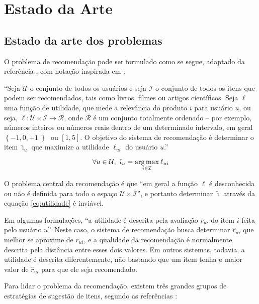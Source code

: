 \chapter[Estado da arte]{Estado da Arte}
\label{chap:estado_da_arte}

\section{Estado da arte dos problemas} %
\label{sec:estado_da_arte_dos_problemas}

O problema de recomendação pode ser formulado como se segue, adaptado da referência \cite{adomavicius2005toward}, com notação inspirada em \cite{symeonidis2007feature}: 

``Seja $\mathcal{U}$ o conjunto de todos os usuários e seja $\mathcal{I}$ o conjunto de todos os itens que podem ser recomendados, tais como livros, filmes ou artigos científicos. Seja $\ell$ uma função de utilidade, que mede a relevância do produto $i$ para usuário $u$, ou seja, $\ell: \mathcal{U} \times \mathcal{I} \rightarrow \mathcal{R}$, onde $\mathcal{R}$ é um  conjunto totalmente ordenado -- por exemplo, números inteiros ou números reais dentro de um determinado intervalo, em geral $\left\{-1, 0, +1\left\}$ ou $[1, 5]$. O objetivo do sistema de recomendação é determinar o item $\tilde{\imath}_u$ que maximize a utilidade $\ell_{ui}$ do usuário $u$.''

\begin{equation} 
\label{eq:utilidade}
\forall u \in \mathcal{U}, ~ \tilde{\imath}_u = \operatorname*{arg\,max}_{i \in \mathcal{I}}{\ell_{ui}}
\end{equation}

O problema central da recomendação é que ``em geral a função $\ell$ é desconhecida ou não é definida para todo o espaço $\mathcal{U} \times \mathcal{I}$'', e portanto determinar $\tilde{\imath}$ através da equação \ref{eq:utilidade} é inviável. 

Em algumas formulações, ``a utilidade é descrita pela avaliação $r_{ui}$ do item $i$ feita pelo usuário $u$''. Neste caso, o sistema de recomendação busca determinar $\hat{r}_{ui}$ que melhor se aproxime de $r_{ui}$, e a qualidade da recomendação é normalmente descrita pela distância entre esses dois valores. Em outros sistemas, todavia, a utilidade é descrita diferentemente, não bastando que um item tenha o maior valor de $\hat{r}_{ui}$ para que ele seja recomendado. 

Para lidar o problema da recomendação, existem três grandes grupos de estratégias de sugestão de itens, segundo as referências \cite{adomavicius2005toward,balabanovic97fab}:


